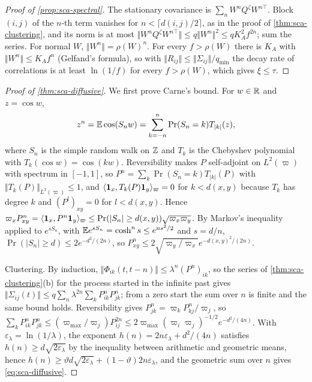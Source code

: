 \begin{proof}[Proof of \cref{prop:sca-spectral}]
The stationary covariance is $\sum_nW^nQ^\zeta W^{n\top}$. Block $(i,j)$ of the $n$-th term vanishes for $n<\lceil d(i,j)/2\rceil$, as in the proof of \cref{thm:sca-clustering}, and its norm is at most $\Vert W^nQ^\zeta W^{n\top}\Vert\le q\Vert W^n\Vert^2\le qK_A^2f^{2n}$; sum the series. For normal $W$, $\Vert W^n\Vert=\rho(W)^n$. For every $f>\rho(W)$ there is $K_A$ with $\Vert W^n\Vert\le K_Af^n$ (Gelfand's formula), so with $\Vert R_{ij}\Vert\le\Vert\Sigma_{ij}\Vert/q_{\min}$ the decay rate of correlations is at least $\ln(1/f)$ for every $f>\rho(W)$, which gives $\xi\le\tau$.
\end{proof}

\begin{proof}[Proof of \cref{thm:sca-diffusive}]
We first prove Carne's bound. For $w\in\mathbb{R}$ and $z=\cos w$,
\begin{equation*}
z^n=\mathbb{E}\cos(S_nw)=\sum_{k=-n}^n\Pr(S_n=k)T_{|k|}(z),
\end{equation*}
where $S_n$ is the simple random walk on $\mathbb{Z}$ and $T_k$ is the Chebyshev polynomial with $T_k(\cos w)=\cos(kw)$. Reversibility makes $P$ self-adjoint on $L^2(\varpi)$ with spectrum in $[-1,1]$, so $P^n=\sum_k\Pr(S_n=k)T_{|k|}(P)$ with $\Vert T_k(P)\Vert_{L^2(\varpi)}\le1$, and $\langle\mathbf{1}_x,T_k(P)\mathbf{1}_y\rangle_\varpi=0$ for $k<d(x,y)$ because $T_k$ has degree $k$ and $(P^l)_{xy}=0$ for $l<d(x,y)$. Hence $\varpi_xP^n_{xy}=\langle\mathbf{1}_x,P^n\mathbf{1}_y\rangle_\varpi\le\Pr(|S_n|\ge d(x,y))\sqrt{\varpi_x\varpi_y}$. By Markov's inequality applied to $e^{sS_n}$, with $\mathbb{E} e^{sS_n}=\cosh^ns\le e^{ns^2/2}$ and $s=d/n$, $\Pr(|S_n|\ge d)\le2e^{-d^2/(2n)}$, so $P^n_{xy}\le2\sqrt{\varpi_y/\varpi_x}e^{-d(x,y)^2/(2n)}$.

Clustering. By induction, $\Vert\Phi_{ik}(t,t-n)\Vert\le\lambda^n(P^n)_{ik}$, so the series of \cref{thm:sca-clustering}(b) for the process started in the infinite past gives $\Vert\Sigma_{ij}(t)\Vert\le q\sum_n\lambda^{2n}\sum_kP^n_{ik}P^n_{jk}$; from a zero start the sum over $n$ is finite and the same bound holds. Reversibility gives $P^n_{jk}=\varpi_kP^n_{kj}/\varpi_j$, so $\sum_kP^n_{ik}P^n_{jk}\le(\varpi_{\max}/\varpi_j)P^{2n}_{ij}\le2\varpi_{\max}(\varpi_i\varpi_j)^{-1/2}e^{-d^2/(4n)}$. With $\varepsilon_\lambda=\ln(1/\lambda)$, the exponent $h(n)=2n\varepsilon_\lambda+d^2/(4n)$ satisfies $h(n)\ge d\sqrt{2\varepsilon_\lambda}$ by the inequality between arithmetic and geometric means, hence $h(n)\ge\vartheta d\sqrt{2\varepsilon_\lambda}+(1-\vartheta)2n\varepsilon_\lambda$, and the geometric sum over $n$ gives \eqref{eq:sca-diffusive}.
\end{proof}

